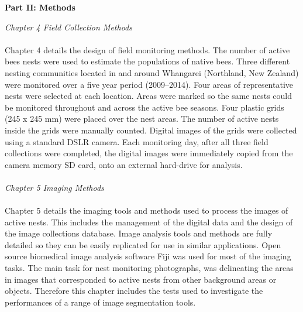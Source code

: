 \begin{flushright}
\textbf{Part II: Methods}
\end{flushright}
\emph{Chapter 4 Field Collection Methods}\\
\\
Chapter 4 details the design of field monitoring methods. The number of active bees nests were used to estimate the populations of native bees. Three different nesting communities located in and around Whangarei (Northland, New Zealand) were monitored over a five year period (2009--2014). Four areas of representative nests were selected at each location. Areas were marked so the same nests could be monitored throughout and across the active bee seasons. Four plastic grids (245 x 245 mm) were placed over the nest areas. The number of active nests inside the grids were manually counted. Digital images of the grids were collected using a standard \ac{DSLR} camera. Each monitoring day, after all three field collections were completed, the digital images were immediately copied from the camera memory \ac{SD} card, onto an external hard-drive for analysis.\\
\\
\emph{Chapter 5 Imaging Methods}\\
\\
Chapter 5 details the imaging tools and methods used to process the images of active nests. This includes the management of the digital data and the design of the image collections database. Image analysis tools and methods are fully detailed so they can be easily replicated for use in similar applications. Open source biomedical image analysis software \ac{Fiji} was used for most of the imaging tasks. The main task for nest monitoring photographs, was delineating the areas in images that corresponded to active nests from other background areas or objects. Therefore this chapter includes the tests used to investigate the performances of a range of image segmentation tools. 

